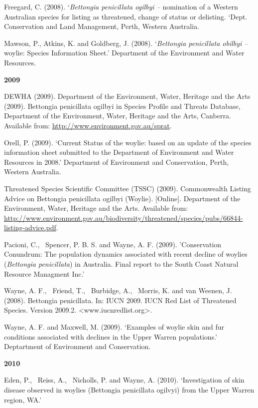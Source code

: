 \documentclass[version=last,
    paper=a4,                               %
    10pt,                                   %
    dvipsnames,
    oneside,                              %
    headings=openany,                       %
    open=any,
    BCOR=7mm,                               %
    DIV=15,     %
]{scrbook}
\begin{document}
Freegard, C. (2008). `\emph{Bettongia penicillata ogilbyi --} nomination
of a Western Australian species for listing as threatened, change of
status or delisting. `Dept. Conservation and Land Management, Perth,
Western Australia.

Mawson, P., Atkins, K. and Goldberg, J. (2008). `\emph{Bettongia
penicillata obilbyi --}woylie: Species Information Sheet.' Department of
the Environment and Water Resources.

\textbf{2009}

DEWHA (2009). Department of the Environment, Water, Heritage and the
Arts (2009). Bettongia penicillata ogilbyi in Species Profile and
Threats Database, Department of the Environment, Water, Heritage and the
Arts, Canberra. Available from:
\href{http://www.environment.gov.au/sprat}{http://www.environment.gov.au/sprat}.

Orell, P. (2009). `Current Status of the woylie: based on an update of
the species information sheet submitted to the Department of Environment
and Water Resources in 2008.' Department of Environment and
Conservation, Perth, Western Australia.

Threatened Species Scientific Committee (TSSC) (2009). Commonwealth
Listing Advice on Bettongia penicillata ogilbyi (Woylie). {[}Online{]}.
Department of the Environment, Water, Heritage and the Arts. Available
from:
\href{http://www.environment.gov.au/biodiversity/threatened/species/pubs/66844-listing-advice.pdf}{http://www.environment.gov.au/biodiversity/threatened/species/pubs/66844-listing-advice.pdf}.

Pacioni, C.,~ Spencer, P. B. S. and Wayne, A. F. (2009). 'Conservation
Conundrum: The population dynamics associated with recent decline of
woylies (\emph{Bettongia penicillata}) in Australia. Final report to the
South Coast Natural Resource Managment Inc.'

Wayne, A. F.,~ Friend, T.,~ Burbidge, A.,~ Morris, K. and van Weenen, J.
(2008). Bettongia penicillata. In: IUCN 2009. IUCN Red List of
Threatened Species. Version 2009.2.
\textless{}www.iucnredlist.org\textgreater{}.

Wayne, A. F. and Maxwell, M. (2009). `Examples of woylie skin and fur
conditions associated with declines in the Upper Warren populations.'
Deptartment of Environment and Conservation.

\textbf{2010}

Eden, P.,~ Reiss, A.,~ Nicholls, P. and Wayne, A. (2010). `Investigation
of skin disease observed in woylies (Bettongia penicillata ogilvyi) from
the Upper Warren region, WA.'
\end{document}
